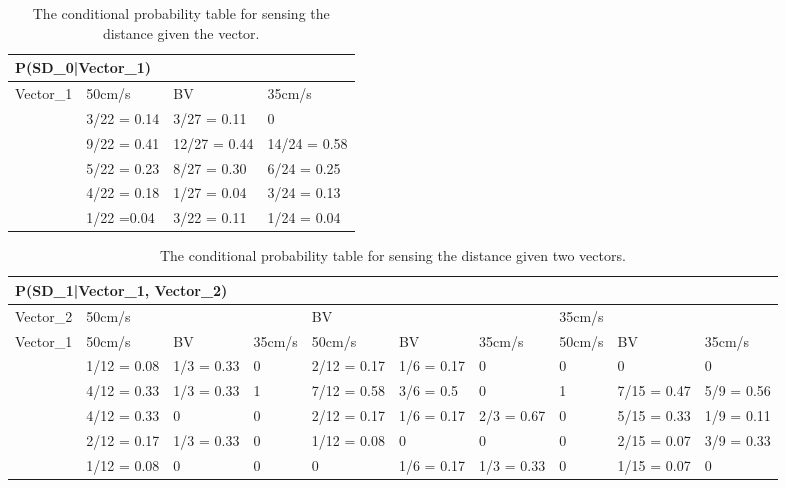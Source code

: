 \begin{center}
\begin{table}[H]
\begin{tabular}{|l|l|l|l|}
\hline
\multicolumn{4}{|l|}{P(SD\_0|Vector\_1)} \\ \hline
Vector\_1     & 50cm/s & BV & 35cm/s \\\hline 
[0 - 60]      & 3/22 = 0.14 & 3/27 = 0.11 & 0 \\ \hline 
[60 - 75]    & 9/22 = 0.41 & 12/27 = 0.44 & 14/24 = 0.58 \\ \hline
[75 - 90]   & 5/22 = 0.23 & 8/27 = 0.30 & 6/24 = 0.25 \\ \hline
[90 - 105]   & 4/22 = 0.18 & 1/27 = 0.04 & 3/24 = 0.13 \\ \hline
[105 - 255]   & 1/22 =0.04 & 3/22 = 0.11 & 1/24 = 0.04   \\ \hline
\end{tabular}
\caption{The conditional probability table for sensing the distance given the
vector.}
\label{SDtable}
\end{table}
\end{center}


\begin{table}[H]
\centering
\begin{tabular}{|l|p{1.2cm}|p{1.2cm}|l|p{1.2cm}|p{1.2cm}|p{1.2cm}|l|p{1.2cm}|p{1.2cm}|}
\hline
\multicolumn{10}{|l|}{P(SD\_1|Vector\_1, Vector\_2)} \\\hline 
Vector\_2 & \multicolumn{3}{l|}{50cm/s} & \multicolumn{3}{l|}{BV} &
\multicolumn{3}{l|}{35cm/s}\\\hline 
Vector\_1 & 50cm/s      &  BV     & 35cm/s      & 50cm/s      & BV      & 35cm/s     
& 50cm/s & BV & 35cm/s \\\hline
[0-60]&1/12 = 0.08 & 1/3 = 0.33 & 0      & 2/12 = 0.17 & 1/6 = 0.17 & 0 & 0  
& 0 & 0 \\ \hline
[60-75]&4/12 = 0.33 & 1/3 = 0.33 & 1      & 7/12 = 0.58 & 3/6 = 0.5 & 0      & 1     
& 7/15 = 0.47 & 5/9 = 0.56\\ \hline
[75-90] & 4/12 = 0.33 & 0 & 0 & 2/12 = 0.17 & 1/6 = 0.17 & 2/3 = 0.67 & 0 
& 5/15 = 0.33 &1/9 = 0.11\\\hline
[90-105] & 2/12 = 0.17 & 1/3 = 0.33 & 0 & 1/12 = 0.08 & 0 & 0 & 0 
& 2/15 = 0.07  & 3/9 = 0.33\\\hline
[105-255] & 1/12 = 0.08 & 0 & 0 & 0 & 1/6 = 0.17 & 1/3 = 0.33 & 0 & 1/15 = 0.07     
&0\\\hline
\end{tabular}
\caption{The conditional probability table for sensing the distance given two
vectors.}
\label{SDtable2}
\end{table}

